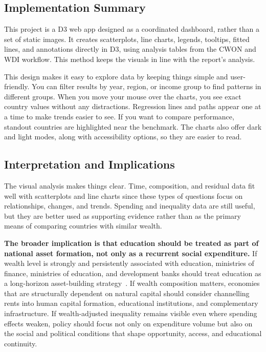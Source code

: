 \documentclass{vgtc}
\begin{document}
\subsection{Implementation Summary}
This project is a D3 web app designed as a coordinated dashboard, rather than a set of static images. It creates scatterplots, line charts, legends, tooltips, fitted lines, and annotations directly in D3, using analysis tables from the CWON and WDI workflow. This method keeps the visuals in line with the report’s analysis.

This design makes it easy to explore data by keeping things simple and user-friendly. You can filter results by year, region, or income group to find patterns in different groups. When you move your mouse over the charts, you see exact country values without any distractions. Regression lines and paths appear one at a time to make trends easier to see. If you want to compare performance, standout countries are highlighted near the benchmark. The charts also offer dark and light modes, along with accessibility options, so they are easier to read.

\subsection{Interpretation and Implications}
The visual analysis makes things clear. Time, composition, and residual data fit well with scatterplots and line charts since these types of questions focus on relationships, changes, and trends. Spending and inequality data are still useful, but they are better used as supporting evidence rather than as the primary means of comparing countries with similar wealth.

\textbf{The broader implication is that education should be treated as part of national asset formation, not only as a recurrent social expenditure.} If wealth level is strongly and persistently associated with education, ministries of finance, ministries of education, and development banks should treat education as a long-horizon asset-building strategy~\cite{cwon2021, hcp}. If wealth composition matters, economies that are structurally dependent on natural capital should consider channelling rents into human capital formation, educational institutions, and complementary infrastructure. If wealth-adjusted inequality remains visible even where spending effects weaken, policy should focus not only on expenditure volume but also on the social and political conditions that shape opportunity, access, and educational continuity.
\end{document}

